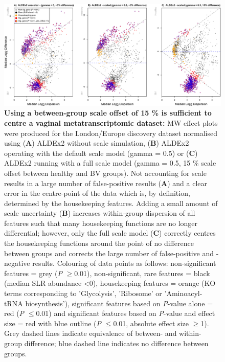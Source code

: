 \documentclass[sn-mathphys,Numbered]{sn-jnl}%
\begin{document}
\begin{figure}[H]
	\centering
	\includegraphics[scale = 0.88]{0_supplFig1_revised.png}
	\caption{\textbf{Using a between-group scale offset of 15 \% is sufficient to centre a vaginal metatranscriptomic dataset:} MW effect plots were produced for the London/Europe discovery dataset normalised using (\textbf{A}) ALDEx2 without scale simulation, (\textbf{B}) ALDEx2 operating with the default scale model (gamma = 0.5) or (\textbf{C}) ALDEx2 running with a full scale model (gamma = 0.5, 15 \% scale offset between healthy and BV groups). Not accounting for scale results in a large number of false-positive results (\textbf{A}) and a clear error in the centre-point of the data which is, by definition, determined by the housekeeping features. Adding a small amount of scale uncertainty (\textbf{B}) increases within-group dispersion of all features such that many housekeeping functions are no longer differential; however, only the full scale model (\textbf{C}) correctly centres the housekeeping functions around the point of no difference between groups and corrects the large number of false-positive and -negative results. Colouring of data points as follows: non-significant features = grey (\textit{P} $\geq$0.01), non-significant, rare features = black (median SLR abundance <0), housekeeping features = orange (KO terms corresponding to 'Glycolysis', 'Ribosome' or 'Aminoacyl-tRNA biosynthesis'), significant features based on \textit{P}-value alone = red (\textit{P} $\leq$0.01) and significant features based on \textit{P}-value and effect size = red with blue outline (\textit{P} $\leq$0.01, absolute effect size $\geq$1). Grey dashed lines indicate equivalence of between- and within- group difference; blue dashed line indicates no difference between groups.} \label{fig:sfigScaleMWplots}
\end{figure}
\newpage
\end{document}
